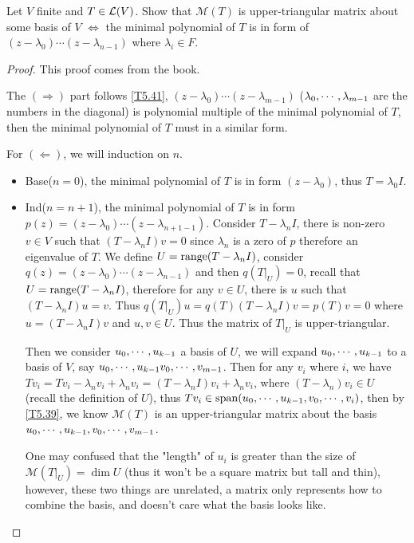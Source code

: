 \documentclass[../main.tex]{subfiles}
\begin{document}
\setcounter{theorem}{43}
\begin{theorem}
  Let $V$ finite and $T \in \mathcal{L}(V)$. Show that $\mathcal{M}(T)$ is upper-triangular matrix
  about some basis of $V$ $\iff$ the minimal polynomial of $T$ is in form of $(z - \lambda_0)\cdots(z - \lambda_{n - 1})$
  where $\lambda_i \in F$.
\end{theorem}
\begin{proof}
  This proof comes from the book.

  The $(\Rightarrow)$ part follows \cref{T5.41}, $(z - \lambda_0) \cdots (z - \lambda_{m - 1})$
  ($\lambda_0 , \cdots , \lambda_{m - 1}$ are the numbers in the diagonal) is polynomial multiple of 
  the minimal polynomial of $T$, then the minimal polynomial of $T$
  must in a similar form.

  For $(\Leftarrow)$, we will induction on $n$.
  \begin{itemize}
    \item Base($n = 0$), the minimal polynomial of $T$ is in form $(z - \lambda_0)$,
          thus $T = \lambda_0 I$.
    \item Ind($n = n + 1$), the minimal polynomial of $T$ is in form $p(z) = (z - \lambda_0) \cdots (z - \lambda_{n + 1 - 1})$.
          Consider $T - \lambda_nI$, there is non-zero $v \in V$ such that $(T - \lambda_nI)v = 0$
          since $\lambda_n$ is a zero of $p$ therefore an eigenvalue of $T$.
          We define $U = \operatorname{range} (T - \lambda_n I)$, consider $q(z) = (z - \lambda_0)\cdots(z - \lambda_{n - 1})$
          and then $q(T\big|_U) = 0$, recall that $U = \operatorname{range} (T - \lambda_n I)$, therefore for any $v \in U$, there is $u$ such that $(T - \lambda_nI)u = v$.
          Thus $q(T\big|_U)u = q(T)(T - \lambda_n I)v = p(T)v = 0$ where $u = (T - \lambda_n I) v$ and $u, v \in U$.
          Thus the matrix of $T\big|_U$ is upper-triangular.

          Then we consider $u_0 , \cdots , u_{k - 1}$ a basis of $U$, we will expand $u_0 , \cdots , u_{k - 1}$
          to a basis of $V$, say $u_0 , \cdots , u_{k - 1}v_0 , \cdots , v_{m - 1}$.
          Then for any $v_i$ where $i $, we have $Tv_i = Tv_i - \lambda_nv_i + \lambda_n v_i = (T - \lambda_n I)v_i + \lambda_n v_i$,
          where $(T - \lambda_n) v_i \in U$ (recall the definition of $U$),
          thus $Tv_i \in \operatorname{span}(u_0 , \cdots , u_{k - 1}, v_0 , \cdots , v_{i})$, then by \ref{T5.39},
          we know $\mathcal{M}(T)$ is an upper-triangular matrix about
          the basis $u_0 , \cdots , u_{k - 1}, v_0 , \cdots , v_{m - 1}$.

          One may confused that the "length" of $u_i$ is greater than the size of $\mathcal{M}(T\big|_U) = \dim U$
          (thus it won't be a square matrix but tall and thin),
          however, these two things are unrelated, a matrix only represents how to combine
          the basis, and doesn't care what the basis looks like.
  \end{itemize}
\end{proof}
\end{document}
